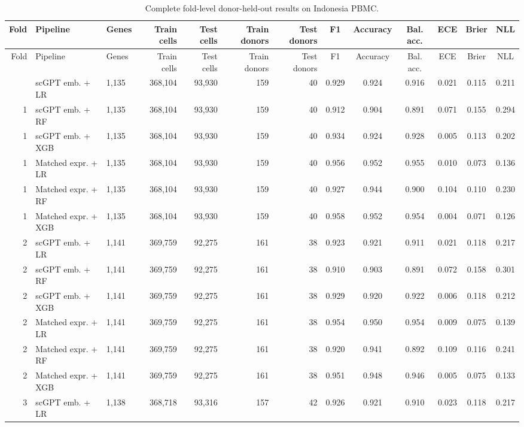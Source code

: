 \begin{landscape}\scriptsize\setlength{\tabcolsep}{3pt}
\begin{longtable}{rllrrrrcccccc}
\caption{Complete fold-level donor-held-out results on Indonesia PBMC.}\label{tab:s3}\\
\toprule Fold & Pipeline & Genes & Train cells & Test cells & Train donors & Test donors & F1 & Accuracy & Bal. acc. & ECE & Brier & NLL \\
\midrule\endfirsthead\toprule Fold & Pipeline & Genes & Train cells & Test cells & Train donors & Test donors & F1 & Accuracy & Bal. acc. & ECE & Brier & NLL \\
\midrule\endhead\bottomrule\endlastfoot
1 & scGPT emb. + LR & 1,135 & 368,104 & 93,930 & 159 & 40 & 0.929 & 0.924 & 0.916 & 0.021 & 0.115 & 0.211 \\
1 & scGPT emb. + RF & 1,135 & 368,104 & 93,930 & 159 & 40 & 0.912 & 0.904 & 0.891 & 0.071 & 0.155 & 0.294 \\
1 & scGPT emb. + XGB & 1,135 & 368,104 & 93,930 & 159 & 40 & 0.934 & 0.924 & 0.928 & 0.005 & 0.113 & 0.202 \\
1 & Matched expr. + LR & 1,135 & 368,104 & 93,930 & 159 & 40 & 0.956 & 0.952 & 0.955 & 0.010 & 0.073 & 0.136 \\
1 & Matched expr. + RF & 1,135 & 368,104 & 93,930 & 159 & 40 & 0.927 & 0.944 & 0.900 & 0.104 & 0.110 & 0.230 \\
1 & Matched expr. + XGB & 1,135 & 368,104 & 93,930 & 159 & 40 & 0.958 & 0.952 & 0.954 & 0.004 & 0.071 & 0.126 \\
2 & scGPT emb. + LR & 1,141 & 369,759 & 92,275 & 161 & 38 & 0.923 & 0.921 & 0.911 & 0.021 & 0.118 & 0.217 \\
2 & scGPT emb. + RF & 1,141 & 369,759 & 92,275 & 161 & 38 & 0.910 & 0.903 & 0.891 & 0.072 & 0.158 & 0.301 \\
2 & scGPT emb. + XGB & 1,141 & 369,759 & 92,275 & 161 & 38 & 0.929 & 0.920 & 0.922 & 0.006 & 0.118 & 0.212 \\
2 & Matched expr. + LR & 1,141 & 369,759 & 92,275 & 161 & 38 & 0.954 & 0.950 & 0.954 & 0.009 & 0.075 & 0.139 \\
2 & Matched expr. + RF & 1,141 & 369,759 & 92,275 & 161 & 38 & 0.920 & 0.941 & 0.892 & 0.109 & 0.116 & 0.241 \\
2 & Matched expr. + XGB & 1,141 & 369,759 & 92,275 & 161 & 38 & 0.951 & 0.948 & 0.946 & 0.005 & 0.075 & 0.133 \\
3 & scGPT emb. + LR & 1,138 & 368,718 & 93,316 & 157 & 42 & 0.926 & 0.921 & 0.910 & 0.023 & 0.118 & 0.217 \\

\end{longtable}
\end{landscape}
